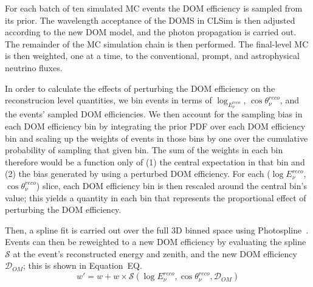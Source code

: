 \documentclass[main.tex]{subfiles}
\begin{document}
For each batch of ten simulated MC events the DOM efficiency is sampled from its prior. 
The wavelength acceptance of the DOMS in CLSim is then adjusted according to the new DOM model, and the photon propagation is carried out. 
The remainder of the MC simulation chain is then performed.
The final-level MC is then weighted, one at a time, to the conventional, prompt, and astrophysical neutrino fluxes. 

In order to calculate the effects of perturbing the DOM efficiency on the reconstrucion level quantities, we bin events in terms of $\log_{E_{\nu}^{reco}}$, $\cos\theta_{\nu}^{reco}$, and the events' sampled DOM efficiencies. 
We then account for the sampling bias in each DOM efficiency bin by integrating the prior PDF over each DOM efficiency bin and scaling up the weights of events in those bins by one over the cumulative probability of sampling that given bin. 
The sum of the weights in each bin therefore would be a function only of (1) the central expectation in that bin and (2) the bias generated by using a perturbed DOM efficiency. 
For each ($\log E_{\nu}^{reco}$, $\cos\theta_{\nu}^{reco}$) slice, each DOM efficiency bin is then rescaled around the central bin's value; this yields a quantity in each bin that represents the proportional effect of perturbing the DOM efficiency. 

Then, a spline fit is carried out over the full 3D binned space using Photospline~\cite{WHITEHORN20132214}. 
Events can then be reweighted to a new DOM efficiency by evaluating the spline $\mathcal{S}$ at the event's reconstructed energy and zenith, and the new DOM efficiency $\mathcal{D}_{OM}$; this is shown in Equation~EQ.
\begin{equation}\label{eq:domeff}
    w' = w + w\times \mathcal{S}(\log E_{\nu}^{reco}, \cos\theta_{\nu}^{reco}, \mathcal{D}_{OM})
\end{equation}
\end{document}
